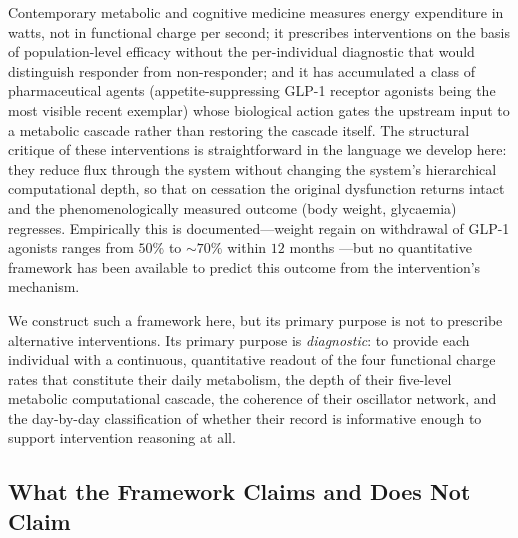 \documentclass[11pt,twocolumn,a4paper]{article}
\theoremstyle{definition}
\theoremstyle{remark}
\begin{document}
Contemporary metabolic and cognitive medicine measures energy
expenditure in watts, not in functional charge per second; it
prescribes interventions on the basis of population-level efficacy
without the per-individual diagnostic that would distinguish responder
from non-responder; and it has accumulated a class of pharmaceutical
agents (appetite-suppressing GLP-1 receptor agonists being the most
visible recent exemplar) whose biological action gates the upstream
input to a metabolic cascade rather than restoring the cascade itself.
The structural critique of these interventions is straightforward in
the language we develop here: they reduce flux through the system
without changing the system's hierarchical computational depth, so
that on cessation the original dysfunction returns intact and the
phenomenologically measured outcome (body weight, glycaemia)
regresses. Empirically this is documented---weight regain on
withdrawal of GLP-1 agonists ranges from $50\%$ to $\sim 70\%$ within
$12$ months \citep{wilding2022, davies2024}---but no quantitative
framework has been available to predict this outcome from the
intervention's mechanism.

We construct such a framework here, but its primary purpose is not to
prescribe alternative interventions. Its primary purpose is
\emph{diagnostic}: to provide each individual with a continuous,
quantitative readout of the four functional charge rates that
constitute their daily metabolism, the depth of their five-level
metabolic computational cascade, the coherence of their oscillator
network, and the day-by-day classification of whether their record is
informative enough to support intervention reasoning at all.

\subsection{What the Framework Claims and Does Not Claim}
\end{document}
